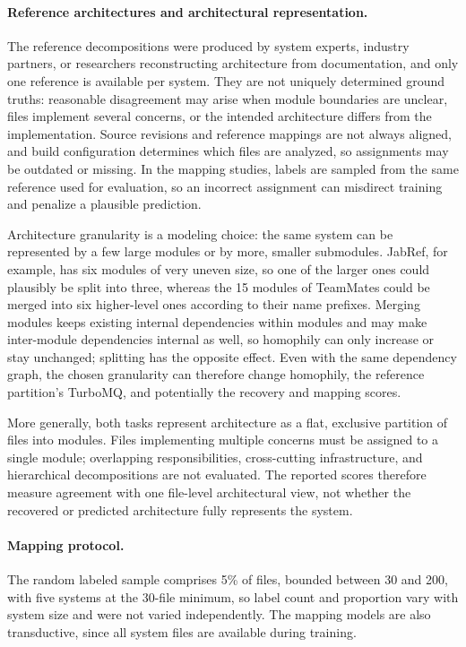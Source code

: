 \paragraph{Reference architectures and architectural representation.}
The reference decompositions were produced by system experts, industry partners, or researchers reconstructing architecture from documentation, and only one reference is available per system. They are not uniquely determined ground truths: reasonable disagreement may arise when module boundaries are unclear, files implement several concerns, or the intended architecture differs from the implementation. Source revisions and reference mappings are not always aligned, and build configuration determines which files are analyzed, so assignments may be outdated or missing. In the mapping studies, labels are sampled from the same reference used for evaluation, so an incorrect assignment can misdirect training and penalize a plausible prediction.

Architecture granularity is a modeling choice: the same system can be represented by a few large modules or by more, smaller submodules. JabRef, for example, has six modules of very uneven size, so one of the larger ones could plausibly be split into three, whereas the 15 modules of TeamMates could be merged into six higher-level ones according to their name prefixes. Merging modules keeps existing internal dependencies within modules and may make inter-module dependencies internal as well, so homophily can only increase or stay unchanged; splitting has the opposite effect. Even with the same dependency graph, the chosen granularity can therefore change homophily, the reference partition’s TurboMQ, and potentially the recovery and mapping scores.

More generally, both tasks represent architecture as a flat, exclusive partition of files into modules. Files implementing multiple concerns must be assigned to a single module; overlapping responsibilities, cross-cutting infrastructure, and hierarchical decompositions are not evaluated. The reported scores therefore measure agreement with one file-level architectural view, not whether the recovered or predicted architecture fully represents the system.

\paragraph{Mapping protocol.} The random labeled sample comprises 5\% of files, bounded between 30 and 200, with five systems at the 30-file minimum, so label count and proportion vary with system size and were not varied independently. The mapping models are also transductive, since all system files are available during training.

